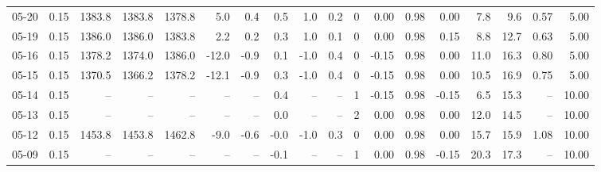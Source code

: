 \begin{threeparttable}
{\begin{tabular}{lrrrrrrrrrrrrrrrrr}
  05-20 &     0.15 & 1383.8 & 1383.8 & 1378.8 &        5.0 &            0.4 &                       0.5 &                      1.0 &                 0.2 &              0 &       0.00 &      0.98 &           0.00 &              7.8 &                 9.6 &            0.57 &                   5.00 \\
  05-19 &     0.15 & 1386.0 & 1386.0 & 1383.8 &        2.2 &            0.2 &                       0.3 &                      1.0 &                 0.1 &              0 &       0.00 &      0.98 &           0.15 &              8.8 &                12.7 &            0.63 &                   5.00 \\
  05-16 &     0.15 & 1378.2 & 1374.0 & 1386.0 &      -12.0 &           -0.9 &                       0.1 &                     -1.0 &                 0.4 &              0 &      -0.15 &      0.98 &           0.00 &             11.0 &                16.3 &            0.80 &                   5.00 \\
  05-15 &     0.15 & 1370.5 & 1366.2 & 1378.2 &      -12.1 &           -0.9 &                       0.3 &                     -1.0 &                 0.4 &              0 &      -0.15 &      0.98 &           0.00 &             10.5 &                16.9 &            0.75 &                   5.00 \\
  05-14 &     0.15 &     -- &     -- &     -- &         -- &             -- &                       0.4 &                       -- &                  -- &              1 &      -0.15 &      0.98 &          -0.15 &              6.5 &                15.3 &              -- &                  10.00 \\
  05-13 &     0.15 &     -- &     -- &     -- &         -- &             -- &                       0.0 &                       -- &                  -- &              2 &       0.00 &      0.98 &           0.00 &             12.0 &                14.5 &              -- &                  10.00 \\
  05-12 &     0.15 & 1453.8 & 1453.8 & 1462.8 &       -9.0 &           -0.6 &                      -0.0 &                     -1.0 &                 0.3 &              0 &       0.00 &      0.98 &           0.00 &             15.7 &                15.9 &            1.08 &                  10.00 \\
  05-09 &     0.15 &     -- &     -- &     -- &         -- &             -- &                      -0.1 &                       -- &                  -- &              1 &       0.00 &      0.98 &          -0.15 &             20.3 &                17.3 &              -- &                  10.00 \\

\end{tabular}}
\end{threeparttable}
